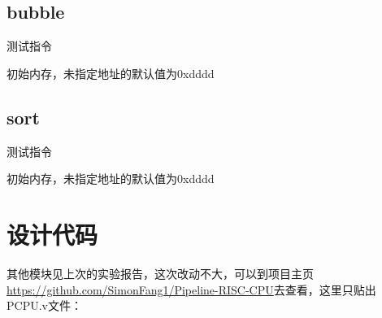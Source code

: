 \documentclass[10pt,a4paper,fleqn]{article}
\begin{document}
\subsection{bubble}
{
\setlength{\columnsep}{5em}
\begin{multicols}{2}
\par 测试指令

\par 初始内存，未指定地址的默认值为0xdddd

\end{multicols}
}
\subsection{sort}
{
\setlength{\columnsep}{5em}
\begin{multicols}{2}
\par 测试指令

\par 初始内存，未指定地址的默认值为0xdddd

\end{multicols}
}
\section{设计代码}
其他模块见上次的实验报告，这次改动不大，可以到项目主页
\url{https://github.com/SimonFang1/Pipeline-RISC-CPU}去查看，这里只贴出PCPU.v文件：

\end{document}

